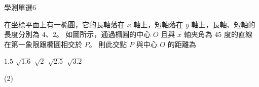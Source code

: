     \begin{QUESTION}
        \begin{ExamInfo}{91}{學測}{單選}{6}
        \end{ExamInfo}
        \begin{ExamAnsRateInfo}{33}{53}{32}{14}
        \end{ExamAnsRateInfo}
        \begin{QBODY}
            在坐標平面上有一橢圓，它的長軸落在 $x$ 軸上，短軸落在 $y$ 軸上，長軸、短軸的長度分別為 $4$、$2$。
            如圖所示，通過橢圓的中心 $O$ 且與 $x$ 軸夾角為 $45$ 度的直線在第一象限跟橢圓相交於 $P$。 則此交點 $P$ 與中心 $O$ 的距離為 
            
            
            \begin{QOPS} 
                \QOP $1.5$
                \QOP $\sqrt{1.6}$ 
                \QOP $\sqrt{2}$ 
                \QOP $\sqrt{2.5}$ 
                \QOP $
                \sqrt{3.2}$
            \end{QOPS}
        
        \end{QBODY}
        \begin{QFROMS}
        \end{QFROMS}
        \begin{QTAGS}\end{QTAGS}
        \begin{QANS}
            (2)
        \end{QANS}
        \begin{QSOLLIST}
        \end{QSOLLIST}
        \begin{QEMPTYSPACE}
        \end{QEMPTYSPACE}
    \end{QUESTION}
